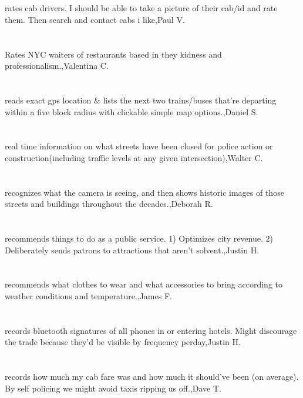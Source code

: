 \section{}rates cab drivers.  I should be able to take a picture of their cab/id and rate them. Then search and contact cabs i like,Paul V.	
\section{}Rates NYC waiters of restaurants based in they kidness and professionalism.,Valentina C.	
\section{}reads exact gps location \& lists the next two trains/buses that're departing within a five block radius with clickable simple map options.,Daniel S.	
\section{}real time information on what streets have been closed for police action or construction(including traffic levels at any given intersection),Walter C.	
\section{}recognizes what the camera is seeing, and then shows historic images of those streets and buildings throughout the decades.,Deborah R.	
\section{}recommends things to do as a public service. 1) Optimizes city revenue. 2) Deliberately sends patrons to attractions that aren't solvent.,Justin H.	
\section{}recommends what clothes to wear and what accessories to bring according to weather conditions and temperature.,James F.	
\section{}records bluetooth signatures of all phones in or entering hotels. Might discourage the trade because they'd be visible by frequency perday,Justin H.	
\section{}  records how much my cab fare was and how much it should've been (on average). By self policing we might avoid taxis ripping us off.,Dave T.
